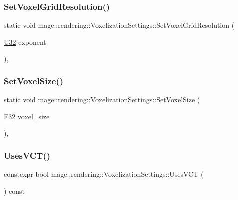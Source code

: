 \subsubsection{\texorpdfstring{Set\+Voxel\+Grid\+Resolution()}{SetVoxelGridResolution()}}
{\footnotesize\ttfamily static void mage\+::rendering\+::\+Voxelization\+Settings\+::\+Set\+Voxel\+Grid\+Resolution (\begin{DoxyParamCaption}\item[{\hyperlink{namespacemage_a41c104c036fba3756a74e19f793eeaa1}{U32}}]{exponent }\end{DoxyParamCaption})\hspace{0.3cm}{\ttfamily [static]}, {\ttfamily [noexcept]}}

\hypertarget{classmage_1_1rendering_1_1_voxelization_settings_a4e1c575474a1301981bc0a0070c2c841}{}\label{classmage_1_1rendering_1_1_voxelization_settings_a4e1c575474a1301981bc0a0070c2c841} 
\subsubsection{\texorpdfstring{Set\+Voxel\+Size()}{SetVoxelSize()}}
{\footnotesize\ttfamily static void mage\+::rendering\+::\+Voxelization\+Settings\+::\+Set\+Voxel\+Size (\begin{DoxyParamCaption}\item[{\hyperlink{namespacemage_aa97e833b45f06d60a0a9c4fc22ae02c0}{F32}}]{voxel\+\_\+size }\end{DoxyParamCaption})\hspace{0.3cm}{\ttfamily [static]}, {\ttfamily [noexcept]}}

\hypertarget{classmage_1_1rendering_1_1_voxelization_settings_a50ce0473e8e9fd22527d4f295c023176}{}\label{classmage_1_1rendering_1_1_voxelization_settings_a50ce0473e8e9fd22527d4f295c023176} 
\subsubsection{\texorpdfstring{Uses\+V\+C\+T()}{UsesVCT()}}
{\footnotesize\ttfamily constexpr bool mage\+::rendering\+::\+Voxelization\+Settings\+::\+Uses\+V\+CT (\begin{DoxyParamCaption}{ }\end{DoxyParamCaption}) const\hspace{0.3cm}{\ttfamily [noexcept]}}



